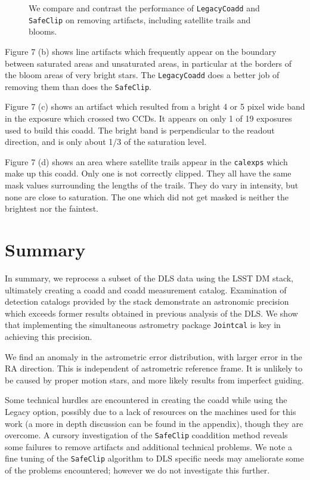 \documentclass[modern]{aastex61}
\begin{document}
\begin{figure}
\caption{We compare and contrast the performance of {\tt\string LegacyCoadd} and {\tt\string SafeClip} on removing artifacts, including satellite trails and blooms.}
\end{figure}

Figure 7 (b) shows line artifacts which frequently appear on the boundary between saturated areas and unsaturated areas, in particular at the borders of the bloom areas of very bright stars. The {\tt\string LegacyCoadd} does a better job of removing them than does the {\tt\string SafeClip}.

Figure 7 (c) shows an artifact which resulted from a bright 4 or 5 pixel wide band in the exposure which crossed two CCDs. It appears on only 1 of 19 exposures used to build this coadd. The bright band is perpendicular to the readout direction, and is only about 1/3 of the saturation level.

Figure 7 (d) shows an area where satellite trails appear in the {\tt\string calexps} which make up this coadd. Only one is not correctly clipped. They all have the same mask values surrounding the lengths of the trails.  They do vary in intensity, but none are close to saturation. The one which did not get masked is neither the brightest nor the faintest.

\bigskip

\section{Summary}
In summary, we reprocess a subset of the DLS data using the LSST DM stack, ultimately creating a coadd and coadd measurement catalog. Examination of detection catalogs provided by the stack demonstrate an astronomic precision which exceeds former results obtained in previous analysis of the DLS. We show that implementing the simultaneous astrometry package {\tt\string Jointcal} is key in achieving this precision. 

We find an anomaly in the astrometric error distribution, with larger error in the RA direction. This is independent of astrometric reference frame.  It is unlikely to be caused by proper motion stars, and more likely results from imperfect guiding.

Some technical hurdles are encountered in creating the coadd while using the Legacy option, possibly due to a lack of resources on the machines used for this work (a more in depth discussion can be found in the appendix), though they are overcome. A cursory investigation of the {\tt\string SafeClip} coaddition method reveals some failures to remove artifacts and additional technical problems. We note a fine tuning of the {\tt\string SafeClip} algorithm to DLS specific needs may ameliorate some of the problems encountered; however we do not investigate this further. 
\end{document}

